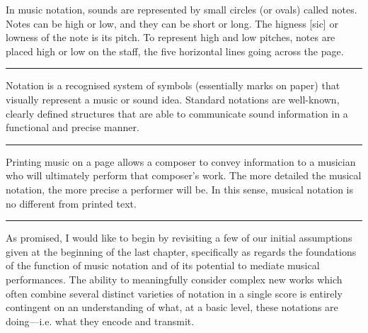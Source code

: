     \begin{smallquote}
        In music notation, sounds are represented by small circles (or ovals) called notes. Notes can be high or low, and they can be short or long. The higness [sic] or lowness of the note is its pitch. To represent high and low pitches, notes are placed high or low on the staff, the five horizontal lines going across the page.\autocite{Wood_2015}
    \begin{center}
    \noindent\rule{1cm}{0.4pt}
    \end{center}   
        Notation is a recognised system of symbols (essentially marks on paper) that visually represent a music or sound idea. Standard notations are well-known, clearly defined structures that are able to communicate sound information in a functional and precise manner.\autocite{debbielyddon_2015}
    \begin{center}
    \noindent\rule{1cm}{0.4pt}
    \end{center}
        Printing music on a page allows a composer to convey information to a musician who will ultimately perform that composer’s work. The more detailed the musical notation, the more precise a performer will be. In this sense, musical notation is no different from printed text.\autocite{Music_101}
    \begin{center}
    \noindent\rule{1cm}{0.4pt}
    \end{center}
        \end{smallquote}
        
    As promised, I would like to begin by revisiting a few of our initial assumptions given at the beginning of the last chapter, specifically as regards the foundations of the function of music notation and of its potential to mediate musical performances. The ability to meaningfully consider complex new works which often combine several distinct varieties of notation in a single score is entirely contingent on an understanding of what, at a basic level, these notations are doing---i.e. what they encode and transmit.
    
